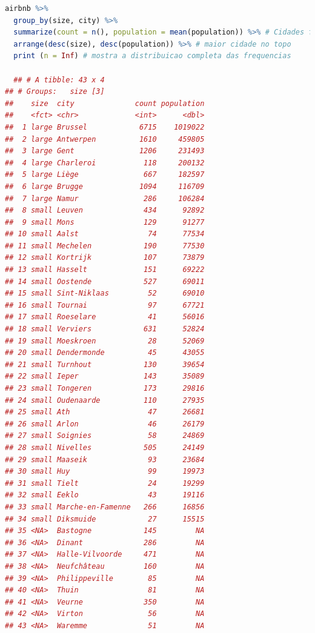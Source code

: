 \documentclass{article}
\begin{document}
\begin{lstlisting}[language=R]
airbnb %>% 
  group_by(size, city) %>% 
  summarize(count = n(), population = mean(population)) %>% # Cidades formam os grupos. Portanto, a populacao media de um grupo = a media de observacoes com a mesma populacao, porque elas vem da mesma cidade = a populacao da cidade
  arrange(desc(size), desc(population)) %>% # maior cidade no topo
  print (n = Inf) # mostra a distribuicao completa das frequencias
  
  ## # A tibble: 43 x 4
## # Groups:   size [3]
##    size  city              count population
##    <fct> <chr>             <int>      <dbl>
##  1 large Brussel            6715    1019022
##  2 large Antwerpen          1610     459805
##  3 large Gent               1206     231493
##  4 large Charleroi           118     200132
##  5 large Liège               667     182597
##  6 large Brugge             1094     116709
##  7 large Namur               286     106284
##  8 small Leuven              434      92892
##  9 small Mons                129      91277
## 10 small Aalst                74      77534
## 11 small Mechelen            190      77530
## 12 small Kortrijk            107      73879
## 13 small Hasselt             151      69222
## 14 small Oostende            527      69011
## 15 small Sint-Niklaas         52      69010
## 16 small Tournai              97      67721
## 17 small Roeselare            41      56016
## 18 small Verviers            631      52824
## 19 small Moeskroen            28      52069
## 20 small Dendermonde          45      43055
## 21 small Turnhout            130      39654
## 22 small Ieper               143      35089
## 23 small Tongeren            173      29816
## 24 small Oudenaarde          110      27935
## 25 small Ath                  47      26681
## 26 small Arlon                46      26179
## 27 small Soignies             58      24869
## 28 small Nivelles            505      24149
## 29 small Maaseik              93      23684
## 30 small Huy                  99      19973
## 31 small Tielt                24      19299
## 32 small Eeklo                43      19116
## 33 small Marche-en-Famenne   266      16856
## 34 small Diksmuide            27      15515
## 35 <NA>  Bastogne            145         NA
## 36 <NA>  Dinant              286         NA
## 37 <NA>  Halle-Vilvoorde     471         NA
## 38 <NA>  Neufchâteau         160         NA
## 39 <NA>  Philippeville        85         NA
## 40 <NA>  Thuin                81         NA
## 41 <NA>  Veurne              350         NA
## 42 <NA>  Virton               56         NA
## 43 <NA>  Waremme              51         NA
\end{lstlisting}
\end{document}
